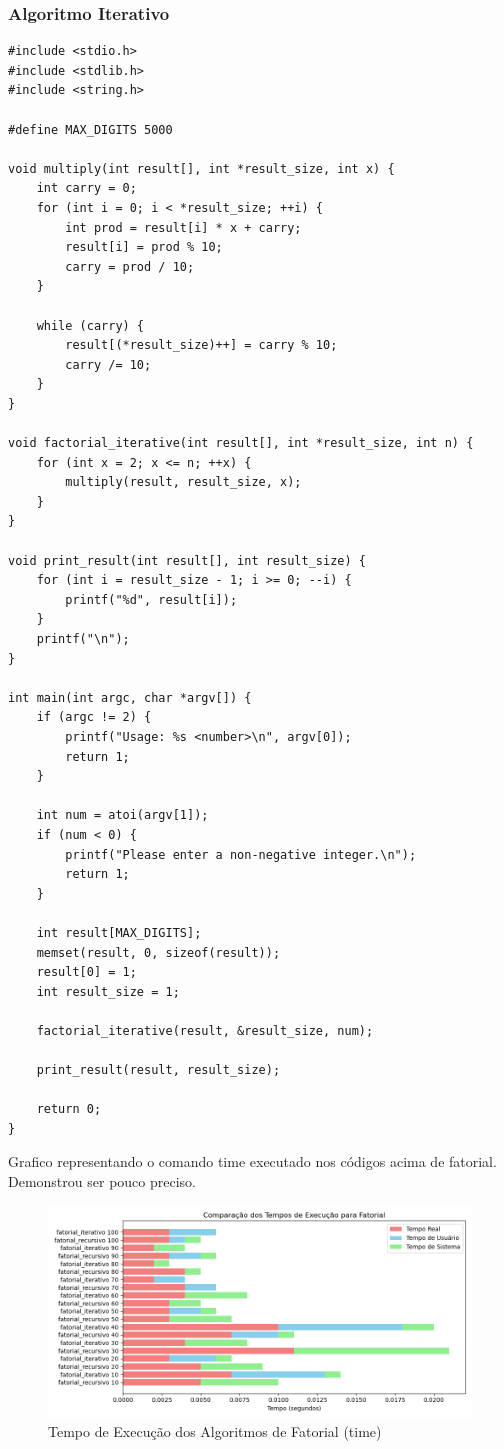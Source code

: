 \documentclass[12pt]{article}
\begin{document}
\subsubsection{Algoritmo Iterativo}
\begin{verbatim}
#include <stdio.h>
#include <stdlib.h>
#include <string.h>

#define MAX_DIGITS 5000

void multiply(int result[], int *result_size, int x) {
    int carry = 0;
    for (int i = 0; i < *result_size; ++i) {
        int prod = result[i] * x + carry;
        result[i] = prod % 10;
        carry = prod / 10;
    }

    while (carry) {
        result[(*result_size)++] = carry % 10;
        carry /= 10;
    }
}

void factorial_iterative(int result[], int *result_size, int n) {
    for (int x = 2; x <= n; ++x) {
        multiply(result, result_size, x);
    }
}

void print_result(int result[], int result_size) {
    for (int i = result_size - 1; i >= 0; --i) {
        printf("%d", result[i]);
    }
    printf("\n");
}

int main(int argc, char *argv[]) {
    if (argc != 2) {
        printf("Usage: %s <number>\n", argv[0]);
        return 1;
    }

    int num = atoi(argv[1]);
    if (num < 0) {
        printf("Please enter a non-negative integer.\n");
        return 1;
    }

    int result[MAX_DIGITS];
    memset(result, 0, sizeof(result));
    result[0] = 1;
    int result_size = 1;

    factorial_iterative(result, &result_size, num);

    print_result(result, result_size);

    return 0;
}
\end{verbatim}

\newpage

Grafico representando o comando time executado nos códigos acima de fatorial. Demonstrou ser pouco preciso.

\begin{figure}[H]
    \centering
    \includegraphics[width=\linewidth]{./resultados/time_fatorial.png}
    \caption{Tempo de Execução dos Algoritmos de Fatorial (time)}
    \label{fig:time_fatorial}
\end{figure}
\end{document}
